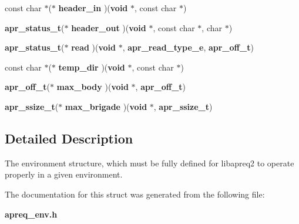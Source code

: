 \begin{CompactItemize}
\item 
{}
const char $\ast$($\ast$ {\bf header\_\-in} )({\bf void} $\ast$, const char $\ast$)\label{structapreq__env__t_m7}

\item 
{}
{\bf apr\_\-status\_\-t}($\ast$ {\bf header\_\-out} )({\bf void} $\ast$, const char $\ast$, char $\ast$)\label{structapreq__env__t_m8}

\item 
{}
{\bf apr\_\-status\_\-t}($\ast$ {\bf read} )({\bf void} $\ast$, {\bf apr\_\-read\_\-type\_\-e}, {\bf apr\_\-off\_\-t})\label{structapreq__env__t_m9}

\item 
{}
const char $\ast$($\ast$ {\bf temp\_\-dir} )({\bf void} $\ast$, const char $\ast$)\label{structapreq__env__t_m10}

\item 
{}
{\bf apr\_\-off\_\-t}($\ast$ {\bf max\_\-body} )({\bf void} $\ast$, {\bf apr\_\-off\_\-t})\label{structapreq__env__t_m11}

\item 
{}
{\bf apr\_\-ssize\_\-t}($\ast$ {\bf max\_\-brigade} )({\bf void} $\ast$, {\bf apr\_\-ssize\_\-t})\label{structapreq__env__t_m12}

\end{CompactItemize}


\subsection{Detailed Description}
The environment structure, which must be fully defined for libapreq2 to operate properly in a given environment. 



The documentation for this struct was generated from the following file:\begin{CompactItemize}
\item 
{\bf apreq\_\-env.h}\end{CompactItemize}
